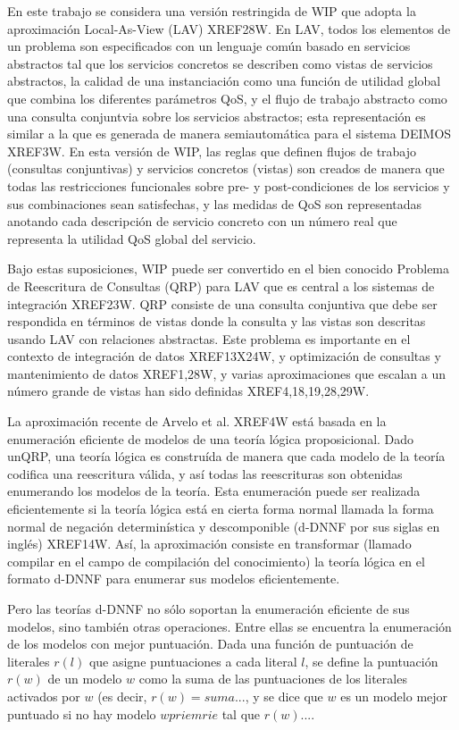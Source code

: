\documentclass{article}
\begin{document}
En este trabajo se considera una versión restringida de WIP que adopta la
aproximación Local-As-View (LAV) XREF28W. En LAV, todos los elementos de un
problema son especificados con un lenguaje común basado en servicios abstractos
tal que los servicios concretos se describen como vistas de servicios
abstractos, la calidad de una instanciación como una función de utilidad global
que combina los diferentes parámetros QoS, y el flujo de trabajo abstracto como
una consulta conjuntvia sobre los servicios abstractos; esta representación es
similar a la que es generada de manera semiautomática para el sistema DEIMOS
XREF3W. En esta versión de WIP, las reglas que definen flujos de trabajo
(consultas conjuntivas) y servicios concretos (vistas) son creados de manera que
todas las restricciones funcionales sobre pre- y post-condiciones de los
servicios y sus combinaciones sean satisfechas, y las medidas de QoS son
representadas anotando cada descripción de servicio concreto con un número real
que representa la utilidad QoS global del servicio.

Bajo estas suposiciones, WIP puede ser convertido en el bien conocido Problema
de Reescritura de Consultas (QRP) para LAV que es central a los sistemas de
integración XREF23W. QRP consiste de una consulta conjuntiva que debe ser
respondida en términos de vistas donde la consulta y las vistas son descritas
usando LAV con relaciones abstractas. Este problema es importante en el contexto
de integración de datos XREF13X24W, y optimización de consultas y mantenimiento
de datos XREF1,28W, y varias aproximaciones que escalan a un número grande de
vistas han sido definidas XREF4,18,19,28,29W.

La aproximación recente de Arvelo et al. XREF4W está basada en la enumeración
eficiente de modelos de una teoría lógica proposicional. Dado unQRP, una teoría
lógica es construída de manera que cada modelo de la teoría codifica una
reescritura válida, y así todas las reescrituras son obtenidas enumerando los
modelos de la teoría. Esta enumeración puede ser realizada eficientemente si la
teoría lógica está en cierta forma normal llamada la forma normal de negación
determinística y descomponible (d-DNNF por sus siglas en inglés) XREF14W. Así,
la aproximación consiste en transformar (llamado compilar en el campo de
compilación del conocimiento) la teoría lógica en el formato d-DNNF para
enumerar sus modelos eficientemente.

Pero las teorías d-DNNF no sólo soportan la enumeración eficiente de sus
modelos, sino también otras operaciones. Entre ellas se encuentra la enumeración
de los modelos con mejor puntuación. Dada una función de puntuación de literales
$r(l)$ que asigne puntuaciones a cada literal $l$, se define la puntuación
$r(w)$ de un modelo $w$ como la suma de las puntuaciones de los literales
activados por $w$ (es decir, $r(w) = suma...$, y se dice que $w$ es un modelo
mejor puntuado si no hay modelo $wpriemrie$ tal que $r(w)...$.
\end{document}
